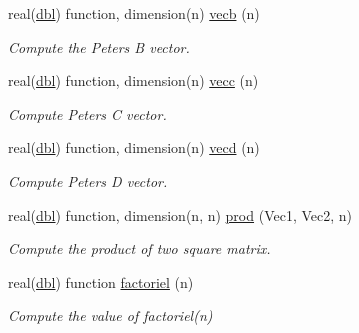\begin{DoxyCompactItemize}
real(\hyperlink{namespaceglobaldatafun_a5008801201dd34f2af8eae07756befb4}{dbl}) function, dimension(n) \hyperlink{namespaceglobaldatafun_a0ef3145b88a5e2f7679e5309ed885bc4}{vecb} (n)
\begin{DoxyCompactList}\small\item\em Compute the Peters B vector. \end{DoxyCompactList}\item 
real(\hyperlink{namespaceglobaldatafun_a5008801201dd34f2af8eae07756befb4}{dbl}) function, dimension(n) \hyperlink{namespaceglobaldatafun_ac274536794b3306528c0130a20080b15}{vecc} (n)
\begin{DoxyCompactList}\small\item\em Compute Peters C vector. \end{DoxyCompactList}\item 
real(\hyperlink{namespaceglobaldatafun_a5008801201dd34f2af8eae07756befb4}{dbl}) function, dimension(n) \hyperlink{namespaceglobaldatafun_a71653a1d825c3dee70490c228d23b738}{vecd} (n)
\begin{DoxyCompactList}\small\item\em Compute Peters D vector. \end{DoxyCompactList}\item 
real(\hyperlink{namespaceglobaldatafun_a5008801201dd34f2af8eae07756befb4}{dbl}) function, dimension(n, n) \hyperlink{namespaceglobaldatafun_afe68f9e5d61e5e7844a0a4b225bb3825}{prod} (Vec1, Vec2, n)
\begin{DoxyCompactList}\small\item\em Compute the product of two square matrix. \end{DoxyCompactList}\item 
real(\hyperlink{namespaceglobaldatafun_a5008801201dd34f2af8eae07756befb4}{dbl}) function \hyperlink{namespaceglobaldatafun_a0ae214f4b91d5705b4d0107913efe369}{factoriel} (n)
\begin{DoxyCompactList}\small\item\em Compute the value of factoriel(n) \end{DoxyCompactList}\end{DoxyCompactItemize}
